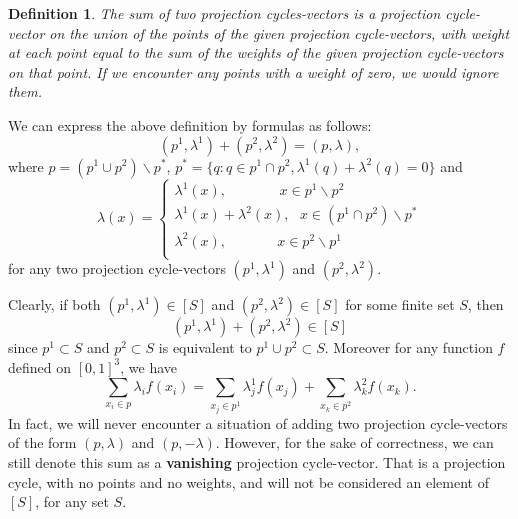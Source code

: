 \documentclass[12p]{article}
\numberwithin{equation}{section}
\newtheorem{definition}{Definition}[section]
\begin{document}
\begin{definition}
    The sum of two projection cycles-vectors is a projection cycle-vector on the union of the points of the given projection cycle-vectors, with weight at each point equal to the sum of the weights of the given projection cycle-vectors on that point. If we encounter any points with a weight of zero, we would ignore them.
\end{definition}
We can express the above definition by formulas as follows: 
\[(p^1,\lambda^1)+(p^2,\lambda^2)=(p,\lambda),\] where
\(
p=\left( p^1 \cup p^2\right) \backslash p^*
\),  $p^*=\{q:q \in p^1 \cap p^2, \lambda^1(q)+\lambda^2(q)=0 \}$
and
\begin{equation}\label{sum of two projection-cycle-vectors}
\lambda(x)=\begin{cases}
    \lambda^1(x), \hspace{45pt} x \in p^1\backslash p^2 \\
    \lambda^1(x)+ \lambda^2(x), \hspace{8pt} x \in \left(p^1 \cap p^2 \right) \backslash p^*\\
    \lambda^2(x), \hspace{43pt}  x \in p^2\backslash p^1 \\
\end{cases}
\end{equation}
for any two projection cycle-vectors $(p^1,\lambda^1)$ and $(p^2,\lambda^2)$. 

Clearly, if both \((p^1,\lambda^1) \in [S] \) and \((p^2,\lambda^2) \in [S]\) for some finite set \(S\), then \[(p^1,\lambda^1)+(p^2,\lambda^2) \in [S]\] since \(p^1 \subset S\) and \(p^2 \subset S\) is equivalent to \(p^1 \cup p^2 \subset S\).
Moreover for any function \(f\) defined on \([0,1]^3\), we have
\[
\sum_{x_i \in p}\lambda_if(x_i)=\sum_{x_j \in p^1}\lambda^1_jf(x_j)+\sum_{x_k \in p^2}\lambda^2_kf(x_k).
\]
In fact, we will never encounter a situation of adding two projection cycle-vectors of the form \((p, \lambda)\) and \((p, -\lambda)\). However, for the sake of correctness, we can still denote this sum as a \textbf{vanishing} projection cycle-vector. That is a projection cycle, with no points and no weights, and will not be considered an element of \([S]\), for any set \(S\).
\end{document}
